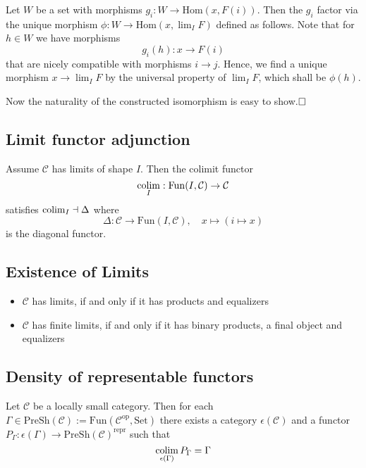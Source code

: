 Let $W$ be a set with morphisms $g_i: W \to \mathrm{Hom}(x, F(i))$. Then the $g_i$ factor via the unique morphism $\phi: W \to \mathrm{Hom}(x, \lim_I F)$ defined as follows.
Note that for $h \in W$ we have morphisms
\begin{equation*}
    g_i(h): x \to F(i)
\end{equation*}
that are nicely compatible with morphisms $i \to j$.
Hence, we find a unique morphism $x \to \lim_I F$ by the universal property of $\lim_I F$, which shall be $\phi(h)$.

Now the naturality of the constructed isomorphism is easy to show.$\hfill\square$

\subsection{Limit functor adjunction}
Assume $\mathcal{C}$ has limits of shape $I$.
Then the colimit functor
\begin{equation*}
    \operatorname*{colim}_I: \mathrm{Fun}(I, \mathcal{C}) \to \mathcal{C}
\end{equation*}
satisfies $\operatorname*{colim}_I \dashv \Delta$ where
\begin{equation*}
    \Delta: \mathcal{C} \to \mathrm{Fun}(I, \mathcal{C}), \quad x \mapsto (i \mapsto x)
\end{equation*}
is the diagonal functor.

\subsection{Existence of Limits}
\begin{itemize}
    \item $\mathcal{C}$ has limits, if and only if it has products and equalizers
    \item $\mathcal{C}$ has finite limits, if and only if it has binary products, a final object and equalizers
\end{itemize}

\subsection{Density of representable functors}
Let $\mathcal{C}$ be a locally small category. 
Then for each $\Gamma \in \mathrm{PreSh}(\mathcal{C}) := \mathrm{Fun}(\mathcal{C}^{\mathrm{op}}, \mathrm{Set})$ there exists a category $\epsilon(\mathcal{C})$ and a functor $P_\Gamma: \epsilon(\Gamma) \to \mathrm{PreSh}(\mathcal{C})^{\mathrm{repr}}$ such that
\begin{equation*}
    \operatorname*{colim}_{\epsilon(\Gamma)} P_\Gamma = \Gamma
\end{equation*}
